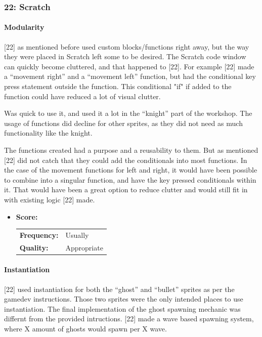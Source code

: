 \subsubsection{22: Scratch}

\paragraph{Modularity}

[22] as mentioned before used custom blocks/functions right away, but the way they were placed in Scratch left some to be desired.
The Scratch code window can quickly become cluttered, and that happened to [22].
For example [22] made a ``movement right'' and a ``movement left'' function, but had the conditional key press statement outside the function.
This conditional "if" if added to the function could have reduced a lot of visual clutter.

Was quick to use it, and used it a lot in the ``knight'' part of the workshop.
The usage of functions did decline for other sprites, as they did not need as much functionality like the knight.

The functions created had a purpose and a reusability to them.
But as mentioned [22] did not catch that they could add the conditionals into most functions.
In the case of the movement functions for left and right, it would have been possible to combine into a singular function, and have the key pressed conditionals within it.
That would have been a great option to reduce clutter and would still fit in with existing logic [22] made.



\begin{itemize}
	\item \textbf{Score:}
	      \begin{tabular}{ll}
		      \textbf{Frequency:} & Usually     \\
		      \textbf{Quality:}   & Appropriate \\
	      \end{tabular}
\end{itemize}

\paragraph{Instantiation}

[22] used instantiation for both the ``ghost'' and ``bullet'' sprites as per the gamedev instructions.
Those two sprites were the only intended places to use instantiation. The final implementation of the ghost spawning mechanic was differnt from the provided intructions. [22] made a wave based spawning system, where X amount of ghosts would spawn per X wave.


